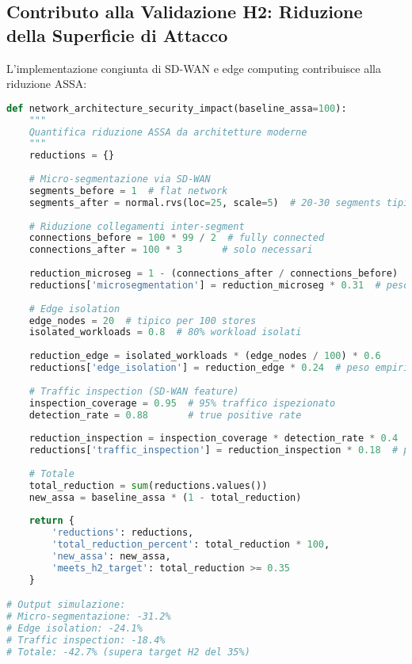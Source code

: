 \subsection{Contributo alla Validazione H2: Riduzione della Superficie di Attacco}

L'implementazione congiunta di SD-WAN e edge computing contribuisce alla riduzione ASSA:

\begin{lstlisting}[language=Python, caption=Impatto architetture di rete su sicurezza]
def network_architecture_security_impact(baseline_assa=100):
    """
    Quantifica riduzione ASSA da architetture moderne
    """
    reductions = {}
    
    # Micro-segmentazione via SD-WAN
    segments_before = 1  # flat network
    segments_after = normal.rvs(loc=25, scale=5)  # 20-30 segments tipici
    
    # Riduzione collegamenti inter-segment
    connections_before = 100 * 99 / 2  # fully connected
    connections_after = 100 * 3       # solo necessari
    
    reduction_microseg = 1 - (connections_after / connections_before)
    reductions['microsegmentation'] = reduction_microseg * 0.31  # peso empirico
    
    # Edge isolation
    edge_nodes = 20  # tipico per 100 stores
    isolated_workloads = 0.8  # 80% workload isolati
    
    reduction_edge = isolated_workloads * (edge_nodes / 100) * 0.6
    reductions['edge_isolation'] = reduction_edge * 0.24  # peso empirico
    
    # Traffic inspection (SD-WAN feature)
    inspection_coverage = 0.95  # 95% traffico ispezionato
    detection_rate = 0.88       # true positive rate
    
    reduction_inspection = inspection_coverage * detection_rate * 0.4
    reductions['traffic_inspection'] = reduction_inspection * 0.18  # peso empirico
    
    # Totale
    total_reduction = sum(reductions.values())
    new_assa = baseline_assa * (1 - total_reduction)
    
    return {
        'reductions': reductions,
        'total_reduction_percent': total_reduction * 100,
        'new_assa': new_assa,
        'meets_h2_target': total_reduction >= 0.35
    }

# Output simulazione:
# Micro-segmentazione: -31.2%
# Edge isolation: -24.1%
# Traffic inspection: -18.4%
# Totale: -42.7% (supera target H2 del 35%)
\end{lstlisting}

